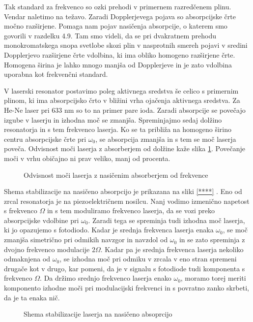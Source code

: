 Tak standard za frekvenco so ozki prehodi v primernem razredčenem plinu.
Vendar naletimo na težavo. Zaradi Dopplerjevega pojava so absorpcijske
črte močno razširjene. Pomaga nam pojav nasičenja absorpcije, o katerem
smo govorili v razdelku 4.9. Tam smo videli, da se pri dvakratnem prehodu
monokromatskega snopa svetlobe skozi plin v nasprotnih smereh pojavi v
sredini Dopplerjevo razširjene črte vdolbina, ki ima obliko homogeno
razširjene črte. Homogena širina je lahko mnogo manjša od Dopplerjeve in
je zato vdolbina uporabna kot frekvenčni standard.

V laserski resonator postavimo poleg aktivnega sredstva še celico s
primernim plinom, ki ima absorpcijsko črto v bližini vrha ojačenja
aktivnega sredstva. Za He-Ne laser pri 633 nm so to na primer pare ioda.
Zaradi absorpcije se povečajo izgube v laserju in izhodna moč se zmanjša.
Spreminjajmo sedaj dolžino resonatorja in s tem frekvenco laserja. Ko se ta
približa na homogeno širino centru absorpcijske črte pri $\omega_0$, se
absorpcija zmanjša in s tem se moč laserja poveča. Odvisnost moči
laserja z absorberjem od dolžine kaže slika \ref{s5.12}. Povečanje moči
v vrhu običajno ni prav veliko, manj od procenta.

\begin{figure}[tbp]
\label{s5.12} \vskip 5cm
\caption{Odvisnost moči laserja z nasičenim absorberjem od frekvence}
\end{figure}

Shema stabilizacije na nasičeno absorpcijo je prikazana na sliki \ref{****}%
. Eno od zrcal resonatorja je na piezoelektričnem nosilcu. Nanj vodimo
izmenično napetost s frekvenco $\Omega$ in s tem moduliramo frekvenco
laserja, da se vozi preko absorpcijske vdolbine pri $\omega_0$. Zaradi tega
se spreminja tudi izhodna moč laserja, ki jo opazujemo s fotodiodo. Kadar
je srednja frekvenca laserja enaka $\omega_0$, se moč zmanjša simetrično
pri odmikih navzgor in navzdol od $\omega_0$ in se zato spreminja z dvojno
frekvenco modulacije $2\Omega$. Kadar pa je srednja frekvenca laserja
nekoliko odmaknjena od $\omega_0$, se izhodna moč pri odmiku v zrcala v eno
stran spremeni drugače kot v drugo, kar pomeni, da je v signalu s fotodiode
tudi komponenta s frekvenco $\Omega$. Da držimo srednjo frekvenco laserja
enako $\omega_0$, moramo torej meriti komponento izhodne moči pri
modulacijski frekvenci in s povratno zanko skrbeti, da je ta enaka nič.

\begin{figure}[tbp]
\label{s5.13} \vskip 7cm
\caption{Shema stabilizacije laserja na nasičeno absoprcijo}
\end{figure}

